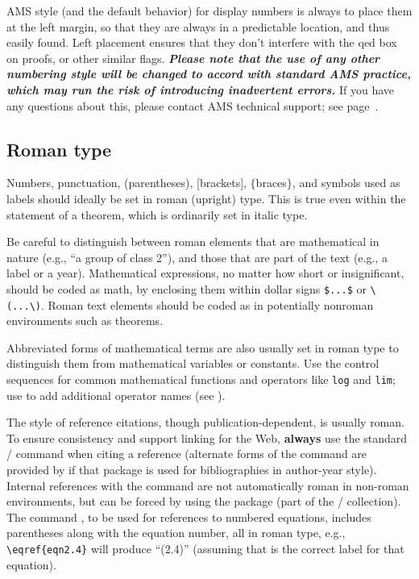 AMS style (and the default behavior) for display numbers is always to
place them at the left margin, so that they are always in a
predictable location, and thus easily found.  Left placement ensures
that they don't interfere with the qed box on proofs, or other similar
flags. \textbf{\emph{Please note that the use of any other numbering style will be
changed to accord with standard AMS practice, which may run the risk of
introducing inadvertent errors.}} If you have any questions about
this, please contact AMS technical support; see
page~\pageref{sec:amsresources}.

\subsection{Roman type}\label{ss:roman}
Numbers, punctuation, (parentheses), [brackets],
$\lbrace$braces$\rbrace$, and symbols used as labels should ideally be
set in roman (upright) type.  This is true even within the statement of
a theorem, which is ordinarily set in italic type.

Be careful to distinguish between roman elements that are mathematical
in nature (e.g., ``a group of class 2''), and those that are part of
the text (e.g., a label or a year).  Mathematical expressions, no matter
how short or insignificant, should be coded as math, by enclosing them
within dollar signs \verb+$...$+ or \verb+\(...\)+.  Roman text elements
should be coded as  in potentially nonroman
environments such as theorems.

Abbreviated forms of mathematical terms are also usually set in roman
type to distinguish them from mathematical variables or constants.
Use the control sequences for common mathematical functions and
operators like \verb+log+ and \verb+lim+; use 
to add additional operator names (see \cite[\S5]{AMG}).

The style of reference citations, though publication-dependent, is
usually roman.  To ensure consistency and support linking for the Web,
\textbf{always} use the standard \latex/  command when citing
a reference (alternate forms of the  command are provided by
 if that package is used for bibliographies in author-year
style).  Internal references with the  command are not
automatically roman in non-roman environments, but can be forced by
using the  package (part of the \amslatex/ collection).
The command , to be used for references to numbered equations,
includes parentheses along with the equation number, all in roman type,
e.g., \verb+\eqref{eqn2.4}+ will produce ``(2.4)'' (assuming that
is the correct label for that equation).

